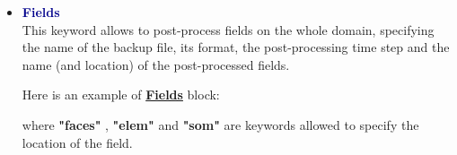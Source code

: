 \begin{itemize}







\item \textcolor{darkblue}{\textbf{Fields}}\\
This keyword allows to post-process fields on the whole domain, specifying the name of the backup file, its format, the post-processing time step and the name (and location) of the post-processed fields.

Here is an example of \href{\REFERENCEMANUAL\#champsposts}{\textbf{Fields}} block:
    \begin{center}
    \end{center}

where \textbf{"faces"} , \textbf{"elem"} and \textbf{"som"} are keywords allowed to specify the location of the field.\\


\end{itemize}
